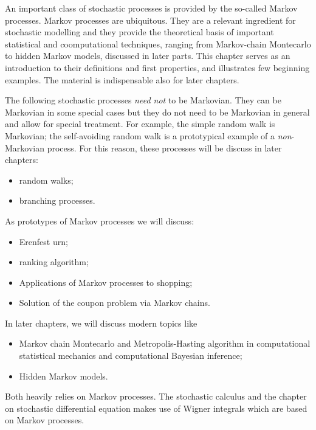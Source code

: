 


\begin{refsection}

   An important class of stochastic processes is provided by the so-called
   Markov processes. 
   Markov processes are ubiquitous.
   They are a relevant ingredient for  
   stochastic modelling and they provide the theoretical basis of important
   statistical and coomputational techniques, ranging
from Markov-chain Montecarlo to hidden Markov models, discussed in later
parts.
   This chapter serves as an introduction to
   their definitions and first properties, and illustrates few beginning examples. The
   material is indispensable also for later chapters. 

   The following stochastic processes \emph{need not} to be Markovian.
   They can be Markovian in some special cases but they do not need to be
   Markovian in general 
   and allow for special treatment.
   For example, the simple  random walk is Markovian; the self-avoiding random
   walk is a prototypical example of a \emph{non}-Markovian process.
   For this reason, these processes will be discuss in later chapters:
   \begin{itemize}
      \item random walks;
      \item branching processes.
   \end{itemize}
   As prototypes of Markov processes we will discuss:
   \begin{itemize}
      \item Erenfest urn;
      \item \google{} \pagerank{} ranking algorithm;
      \item Applications of Markov processes to shopping;
      \item Solution of the coupon problem via Markov chains.
   \end{itemize}
   In later chapters, we will discuss modern topics like
   \begin{itemize}
      \item Markov chain Montecarlo and Metropolis-Hasting algorithm in
	 computational statistical mechanics and computational Bayesian
	 inference;
      \item Hidden Markov models.
      \end{itemize}
      Both heavily relies on Markov processes.
      The stochastic calculus and the chapter on stochastic differential
      equation makes use of Wigner integrals which are based on Markov
      processes.
	 


\end{refsection}
